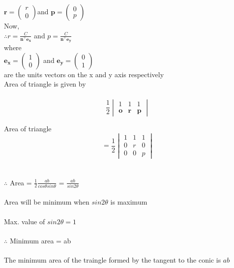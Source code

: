 \documentclass[journal,12pt,twocolumn]{IEEEtran}
\newcommand{\myvec}[1]{\ensuremath{\begin{pmatrix}#1\end{pmatrix}}}
\let\vec\mathbf
\begin{document}
$\vec{r}=\myvec{r\\0}$and $\vec{p}=\myvec{0\\p}$
\\

Now,
\\

$\therefore r=\frac{C}{\vec{n}^{\top}\vec{e_x}}$ and $p=\frac{C}{\vec{n}^{\top}\vec{e_y}}$
\\

where
\\
 
$ \vec{e_x}=\myvec{1\\0} $ and $\vec{e_y}=\myvec{0\\1}$
\\

are the units vectors on the x and y axis respectively
\\

Area of triangle is given by
\\  
\\$$\frac{1}{2} 
\begin{vmatrix}
       1&1&1\\\vec{o}&\vec{r}&\vec{p}
\end{vmatrix}$$
\vspace{0.6cm}

Area of triangle $$= \frac{1}{2} 
\begin{vmatrix}
       1&1&1\\0&r&0\\ 0&0&p
\end{vmatrix}$$
\\
\\

$\therefore$ Area = $\frac{1}{2}\frac{ab}{cos\theta sin\theta}$ = $
\frac{ab}{sin2\theta}$ 
\\
\\

Area will be minimum when $sin2\theta$ is maximum
\\
\\

Max. value of $sin2\theta = 1$
\\
\\

$\therefore$ Minimum area = ab  
\\
\\

The minimum area of the traingle formed by the tangent to the conic is $ab$
\\
\\
\end{document}
